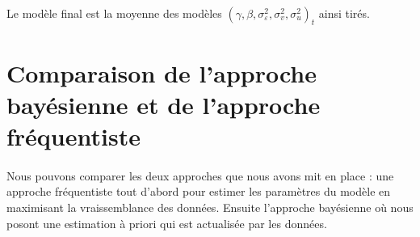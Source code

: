 \documentclass{article}
\theoremstyle{definition}
\theoremstyle{remark}
\begin{document}
\paragraph{}
Le modèle final est la moyenne des modèles $\left(\gamma, \beta, \sigma_{\varepsilon}^{2}, \sigma_{v}^{2}, \sigma_{u}^{2}\right)_t$ 
ainsi tirés.

\newpage




	








\section{Comparaison de l'approche bayésienne et de l'approche fréquentiste}
\paragraph{}
Nous pouvons comparer les deux approches que nous avons mit en place : une approche fréquentiste tout d'abord pour estimer les paramètres du modèle
en maximisant la vraissemblance des données. Ensuite l'approche bayésienne où nous posont une estimation à priori qui est actualisée
par les données.
\end{document}
